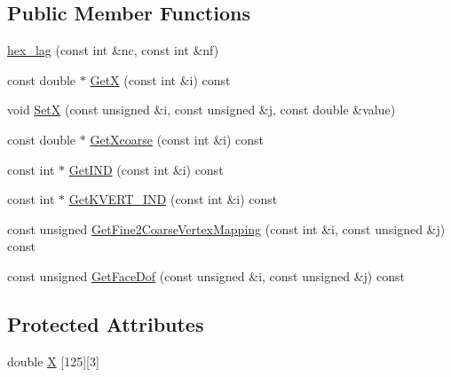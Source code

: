 \subsection*{Public Member Functions}
\begin{DoxyCompactItemize}
\item 
\mbox{\hyperlink{classfemus_1_1hex__lag_a08595500515caff416b69c9ba08e7508}{hex\+\_\+lag}} (const int \&nc, const int \&nf)
\item 
const double $\ast$ \mbox{\hyperlink{classfemus_1_1hex__lag_a1cd01fd5ad9c4c92deaf67e68b9d5a9b}{GetX}} (const int \&i) const
\item 
void \mbox{\hyperlink{classfemus_1_1hex__lag_a74583e35eac434d56a9da2fd00d70038}{SetX}} (const unsigned \&i, const unsigned \&j, const double \&value)
\item 
const double $\ast$ \mbox{\hyperlink{classfemus_1_1hex__lag_a85a1a616557275dca6954a04eaaf5042}{Get\+Xcoarse}} (const int \&i) const
\item 
const int $\ast$ \mbox{\hyperlink{classfemus_1_1hex__lag_ae7c005d638cb17f079302b216114e16e}{Get\+I\+ND}} (const int \&i) const
\item 
const int $\ast$ \mbox{\hyperlink{classfemus_1_1hex__lag_a86a146b7f3f4b8af3b41f86f028e0ac2}{Get\+K\+V\+E\+R\+T\+\_\+\+I\+ND}} (const int \&i) const
\item 
const unsigned \mbox{\hyperlink{classfemus_1_1hex__lag_a6146b93f321a26a7a40cf3cf51a3d802}{Get\+Fine2\+Coarse\+Vertex\+Mapping}} (const int \&i, const unsigned \&j) const
\item 
const unsigned \mbox{\hyperlink{classfemus_1_1hex__lag_a55c8cc6a3fa975cbc7a640c201ae2204}{Get\+Face\+Dof}} (const unsigned \&i, const unsigned \&j) const
\end{DoxyCompactItemize}
\subsection*{Protected Attributes}
\begin{DoxyCompactItemize}
\item 
double \mbox{\hyperlink{classfemus_1_1hex__lag_aa4f8a9df2fcb0a6f0ca0f0381868f8c7}{X}} \mbox{[}125\mbox{]}\mbox{[}3\mbox{]}
\end{DoxyCompactItemize}
